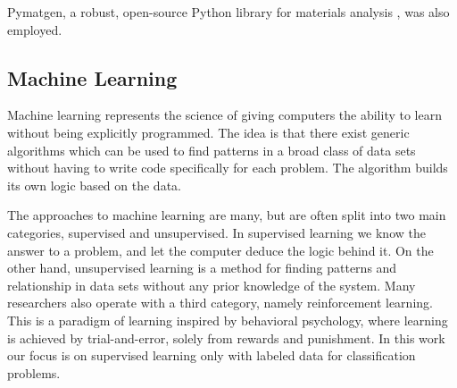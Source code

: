 \documentclass[superscriptaddress,unsortedaddress,
 amsmath,amssymb,
 aps,
]{revtex4-2}
\begin{document}
Pymatgen, a robust, open-source Python library for materials analysis \cite{pymatgen}, was also employed. 

\subsection*{Machine Learning} 

Machine learning represents the science of giving computers the ability to learn without being explicitly programmed. The idea is that there exist generic algorithms which can be used to find patterns in a broad class of data sets without having to write code specifically for each problem. The algorithm builds its own logic based on the data. 

The approaches to machine learning are many, but are often split into two main categories, supervised and unsupervised. In supervised learning we know the answer to a problem, and let the computer deduce the logic behind it. On the other hand, unsupervised learning is a method for finding patterns and relationship in data sets without any prior knowledge of the system. Many researchers also operate with a third category, namely reinforcement learning. This is a paradigm of learning inspired by behavioral psychology, where learning is achieved by trial-and-error, solely from rewards and punishment. In this work our focus is on supervised learning only with labeled data for classification problems.
\end{document}
